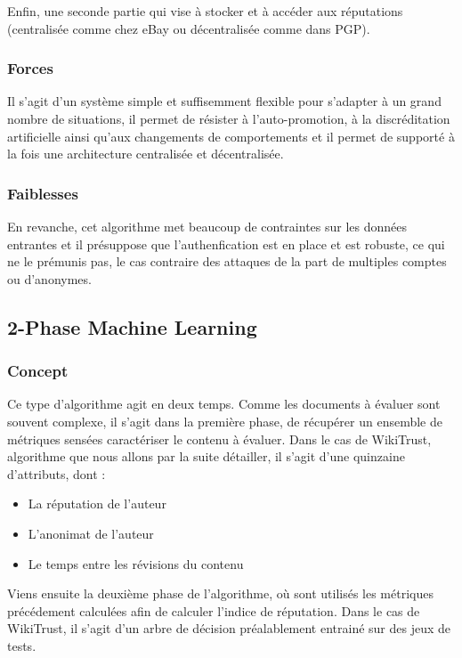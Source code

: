\documentclass[a4paper, 11pt]{article} %
\begin{document}
Enfin, une seconde partie qui vise à stocker et à accéder aux réputations (centralisée comme chez eBay ou décentralisée comme dans PGP).

\subsubsection{Forces}
Il s'agit d'un système simple et suffisemment flexible pour s'adapter à un grand nombre de situations, il permet de résister à l'auto-promotion, à la discréditation artificielle ainsi qu'aux changements de comportements et il permet de supporté à la fois une architecture centralisée et décentralisée.

\subsubsection{Faiblesses}
En revanche, cet algorithme met beaucoup de contraintes sur les données entrantes et il présuppose que l'authenfication est en place et est robuste, ce qui ne le prémunis pas, le cas contraire des attaques de la part de multiples comptes ou d'anonymes.

\subsection{2-Phase Machine Learning}
\subsubsection{Concept}
Ce type d'algorithme agit en deux temps.
Comme les documents à évaluer sont souvent complexe, il s'agit dans la première phase, de récupérer un ensemble de métriques sensées caractériser le contenu à évaluer.
Dans le cas de WikiTrust, algorithme que nous allons par la suite détailler, il s'agit d'une quinzaine d'attributs, dont :
\begin{itemize}
	\item La réputation de l'auteur
	\item L'anonimat de l'auteur
	\item Le temps entre les révisions du contenu
\end{itemize}
Viens ensuite la deuxième phase de l'algorithme, où sont utilisés les métriques précédement calculées afin de calculer l'indice de réputation.
Dans le cas de WikiTrust, il s'agit d'un arbre de décision préalablement entrainé sur des jeux de tests.
\end{document}
